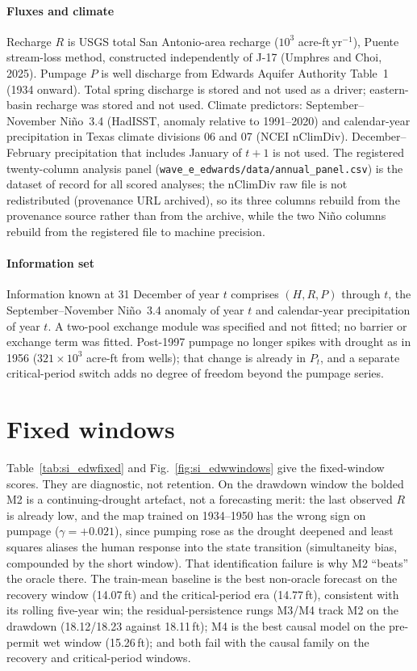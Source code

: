 \paragraph{Fluxes and climate} Recharge $R$ is USGS total San Antonio-area recharge ($10^3$ acre-ft\,yr$^{-1}$), Puente stream-loss method, constructed independently of J-17 (Umphres and Choi, 2025). Pumpage $P$ is well discharge from Edwards Aquifer Authority Table~1 (1934 onward). Total spring discharge is stored and not used as a driver; eastern-basin recharge was stored and not used. Climate predictors: September--November Ni\~no~3.4 (HadISST, anomaly relative to 1991--2020) and calendar-year precipitation in Texas climate divisions 06 and 07 (NCEI nClimDiv). December--February precipitation that includes January of $t+1$ is not used. The registered twenty-column analysis panel (\texttt{wave\_e\_edwards/data/annual\_panel.csv}) is the dataset of record for all scored analyses; the nClimDiv raw file is not redistributed (provenance URL archived), so its three columns rebuild from the provenance source rather than from the archive, while the two Ni\~no columns rebuild from the registered file to machine precision.

\paragraph{Information set} Information known at 31 December of year $t$ comprises $(H,R,P)$ through $t$, the September--November Ni\~no~3.4 anomaly of year $t$ and calendar-year precipitation of year $t$. A two-pool exchange module was specified and not fitted; no barrier or exchange term was fitted. Post-1997 pumpage no longer spikes with drought as in 1956 ($321\times10^3$ acre-ft from wells); that change is already in $P_t$, and a separate critical-period switch adds no degree of freedom beyond the pumpage series.

\FloatBarrier
\section{Fixed windows}\label{si:edwfixed}

Table~\ref{tab:si_edwfixed} and Fig.~\ref{fig:si_edwwindows} give the fixed-window scores. They are diagnostic, not retention. On the drawdown window the bolded M2 is a continuing-drought artefact, not a forecasting merit: the last observed $R$ is already low, and the map trained on 1934--1950 has the wrong sign on pumpage ($\gamma=+0.021$), since pumping rose as the drought deepened and least squares aliases the human response into the state transition (simultaneity bias, compounded by the short window). That identification failure is why M2 ``beats'' the oracle there. The train-mean baseline is the best non-oracle forecast on the recovery window (14.07\,ft) and the critical-period era (14.77\,ft), consistent with its rolling five-year win; the residual-persistence rungs M3/M4 track M2 on the drawdown (18.12/18.23 against 18.11\,ft); M4 is the best causal model on the pre-permit wet window (15.26\,ft); and both fail with the causal family on the recovery and critical-period windows.

